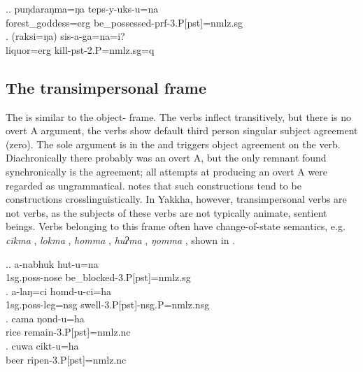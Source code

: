 \ex.\ag. puŋdaraŋma=ŋa  teps-y-uks-u=na\\
forest\_goddess{\sc =erg} be\_possessed{\sc -prf-3.P[pst]=nmlz.sg}\\
\bg. (raksi=ŋa)  sis-a-ga=na=i? \\
		liquor{\sc =erg} kill{\sc -pst-2.P=nmlz.sg=q}\\


 
\subsection{The transimpersonal frame}\label{tr-imp}


\noindent
The   is similar to the object- frame. The verbs inflect transitively, but there is no overt A argument, the verbs show default third person singular subject agreement (zero). The sole argument is in the  and triggers  object agreement on the verb. Diachronically there probably was  an overt A, but the only remnant found synchronically is the agreement; all attempts at producing an overt A were regarded as ungrammatical. \citet{Malchukov2008Split} notes that such constructions tend to be  constructions crosslinguistically. In Yakkha, however, transimpersonal verbs are not  verbs, as the subjects of these verbs are not typically animate, sentient beings. Verbs belonging to this frame often have change-of-state semantics, e.g. \emph{cikma} , \emph{lokma} , \emph{homma} , \emph{huʔma} , \emph{ŋomma} , shown in \Next. 
 
\ex.\ag. a-nabhuk hut-u=na\\
 {\sc 1sg.poss-}nose be\_blocked{\sc -3.P[pst]=nmlz.sg} \\
\bg. a-laŋ=ci homd-u-ci=ha\\
 {\sc 1sg.poss-}leg{\sc =nsg} swell{\sc -3.P[pst]-nsg.P=nmlz.nsg} \\
 \bg. cama ŋond-u=ha\\
rice remain{\sc -3.P[pst]=nmlz.nc}\\
\bg. cuwa cikt-u=ha\\
beer ripen{\sc -3.P[pst]=nmlz.nc}\\
 
